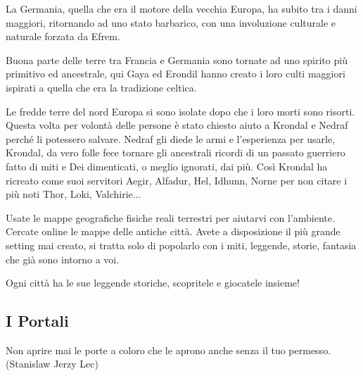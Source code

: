 \begin{multicols}{2}
La Germania, quella che era il motore della vecchia Europa, ha subito tra i danni maggiori, ritornando ad uno stato barbarico, con una involuzione culturale e naturale forzata da Efrem.

Buona parte delle terre tra Francia e Germania sono tornate ad uno spirito più primitivo ed ancestrale, qui Gaya ed Erondil hanno creato i loro culti maggiori ispirati a quella che era la tradizione celtica.

Le fredde terre del nord Europa si sono isolate dopo che i loro morti sono risorti. Questa volta per volontà delle persone è stato chiesto aiuto a Krondal e Nedraf perché li potessero salvare. Nedraf gli diede le armi e l'esperienza per usarle, Krondal, da vero folle fece tornare gli ancestrali ricordi di un passato guerriero fatto di miti e Dei dimenticati, o meglio ignorati, dai più.
Così Krondal ha ricreato come suoi servitori Aegir, Alfadur, Hel, Idhunn, Norne per non citare i più noti Thor, Loki, Valchirie...

\begin{changemargin}{0.3cm}{0.3cm}\begin{narratore} %
Usate le mappe geografiche fisiche reali terrestri per aiutarvi con l'ambiente. Cercate online le mappe delle antiche città. Avete a disposizione il più grande setting mai creato, si tratta solo di popolarlo con i miti, leggende, storie, fantasia che già sono intorno a voi.

Ogni città ha le sue leggende storiche, scopritele e giocatele insieme!
\end{narratore}\end{changemargin}


\end{multicols}

\subsection{I Portali}

\begin{changemargin}{0.3cm}{0.3cm}\begin{enfasi}{
Non aprire mai le porte a coloro che le aprono anche senza il tuo permesso. (Stanislaw Jerzy Lec)}\end{enfasi}\end{changemargin}\medskip

